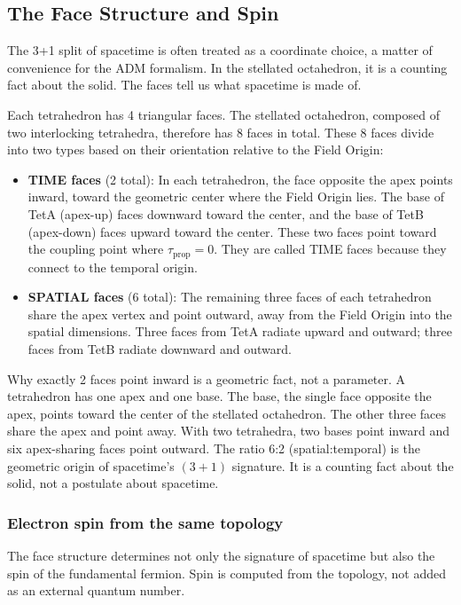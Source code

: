 \documentclass[aps,prd,preprint,superscriptaddress,showpacs,preprintnumbers,amsmath,amssymb,nofootinbib]{revtex4-2}
\begin{document}
\subsection{The Face Structure and Spin}
\label{subsec:faces}

The 3+1 split of spacetime is often treated as a coordinate choice, a matter of convenience for the ADM formalism. In the stellated octahedron, it is a counting fact about the solid. The faces tell us what spacetime is made of.

Each tetrahedron has 4 triangular faces. The stellated octahedron, composed of two interlocking tetrahedra, therefore has 8 faces in total. These 8 faces divide into two types based on their orientation relative to the Field Origin:

\begin{itemize}
\item \textbf{TIME faces} (2 total): In each tetrahedron, the face opposite the apex points inward, toward the geometric center where the Field Origin lies. The base of TetA (apex-up) faces downward toward the center, and the base of TetB (apex-down) faces upward toward the center. These two faces point toward the coupling point where $\tau_{\text{prop}} = 0$. They are called TIME faces because they connect to the temporal origin.
\item \textbf{SPATIAL faces} (6 total): The remaining three faces of each tetrahedron share the apex vertex and point outward, away from the Field Origin into the spatial dimensions. Three faces from TetA radiate upward and outward; three faces from TetB radiate downward and outward.
\end{itemize}

Why exactly 2 faces point inward is a geometric fact, not a parameter. A tetrahedron has one apex and one base. The base, the single face opposite the apex, points toward the center of the stellated octahedron. The other three faces share the apex and point away. With two tetrahedra, two bases point inward and six apex-sharing faces point outward. The ratio 6:2 (spatial:temporal) is the geometric origin of spacetime's $(3{+}1)$ signature. It is a counting fact about the solid, not a postulate about spacetime.

\subsubsection*{Electron spin from the same topology}

The face structure determines not only the signature of spacetime but also the spin of the fundamental fermion. Spin is computed from the topology, not added as an external quantum number.
\end{document}
